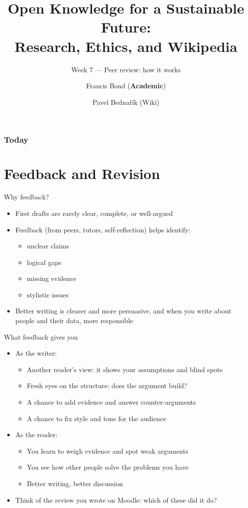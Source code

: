 \documentclass[aspectratio=169]{beamer}
\title[Peer review]{Open Knowledge for a Sustainable Future:\\ Research, Ethics, and Wikipedia}
\subtitle{Week 7 --- Peer review: how it works}
\author[Bond \& Bednařík]{Francis Bond (\textbf{Academic}) \and Pavel Bednařík (Wiki)}
\institute[UPOL \& Wikimedia]{Palacký University Olomouc \quad | \quad Wikimedia ČR}
\date{}
\begin{document}
\begin{frame}
  \titlepage
\end{frame}

\begin{frame}
  \frametitle{Today}
  \small
  \tableofcontents[hideallsubsections]
\end{frame}


\section{Feedback and Revision}

\begin{frame}{Why feedback?}
\begin{itemize}
  \item First drafts are rarely clear, complete, or well-argued
  \item Feedback (from peers, tutors, self-reflection) helps identify:
    \begin{itemize}
    \item unclear claims
    \item logical gaps
    \item missing evidence
    \item stylistic issues
    \end{itemize}
  \item Better writing is clearer and more persuasive, and when you write about people and their data, more responsible
\end{itemize}
\end{frame}

\begin{frame}{What feedback gives you}
\begin{itemize}
  \item As the writer:
    \begin{itemize}
    \item Another reader's view: it shows your assumptions and blind spots
    \item Fresh eyes on the structure: does the argument build?
    \item A chance to add evidence and answer counter-arguments
    \item A chance to fix style and tone for the audience
    \end{itemize}
  \item As the reader:
    \begin{itemize}
    \item You learn to weigh evidence and spot weak arguments
    \item You see how other people solve the problems you have
    \item Better writing, better discussion
    \end{itemize}
  \item Think of the review you wrote on Moodle: which of these did it do?
\end{itemize}
\end{frame}
\end{document}
